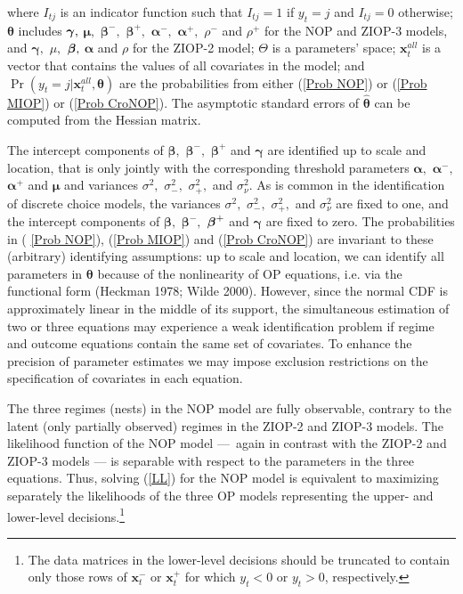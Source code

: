 \documentclass[letterpaper,fleqn,12pt]{article}
\begin{document}
\noindent where $I_{tj}$ is an indicator function such that $I_{tj}=1$ if $%
y_{t}=j$ and $I_{tj}=0$ otherwise; $\mathbf{\theta }$ includes $\mathbf{%
\gamma ,}$ $\mathbf{\mu ,}$ $\mathbf{\beta }^{-},$ $\mathbf{\beta }^{+},$ $%
\mathbf{\alpha }^{-},$ $\mathbf{\alpha }^{+},$ $\rho ^{-}$ and $\rho ^{+}$
for the NOP and ZIOP-3 models, and $\mathbf{\gamma },$ $\mu ,$ $\mathbf{%
\beta },$ $\mathbf{\alpha }$ and $\rho $ for the ZIOP-2 model; $\Theta $ is
a parameters' space; $\mathbf{x}_{t}^{all}$ is a vector that contains the
values of all covariates in the model; and $\Pr (y_{t}=j|\mathbf{x}%
_{t}^{all},\mathbf{\theta })$ are the probabilities from either (\ref{Prob
NOP}) or (\ref{Prob MIOP}) or (\ref{Prob CroNOP}). The asymptotic standard
errors of $\widehat{\mathbf{\theta }}$ can be computed from the Hessian
matrix.

The intercept components of $\mathbf{\beta ,}$ $\mathbf{\beta }^{-},$ $%
\mathbf{\beta }^{+}$ and $\mathbf{\gamma }$ are identified up to scale and
location, that is only jointly with the corresponding threshold parameters $%
\mathbf{\alpha ,}$ $\mathbf{\alpha }^{-}\mathbf{,}$ $\mathbf{\alpha }^{+}$
and $\mathbf{\mu }$ and variances $\sigma ^{2},$ $\sigma _{-}^{2},$ $\sigma
_{+}^{2},$ and $\sigma _{\nu }^{2}$. As is common in the identification of
discrete choice models, the variances $\sigma ^{2},$ $\sigma _{-}^{2},$ $%
\sigma _{+}^{2},$ and $\sigma _{\nu }^{2}$ are fixed to one, and the
intercept components of $\mathbf{\beta ,}$ $\mathbf{\beta }^{-},$ $\mathbf{%
\beta }^{+}$ and $\mathbf{\gamma }$ are fixed to zero. The probabilities in (%
\ref{Prob NOP}), (\ref{Prob MIOP}) and (\ref{Prob CroNOP}) are invariant to
these (arbitrary) identifying assumptions: up to scale and location, we can
identify all parameters in $\mathbf{\theta }$ because of the nonlinearity of
OP equations, i.e. via the functional form (Heckman 1978; Wilde 2000).
However, since the normal CDF is approximately linear in the middle of its
support, the simultaneous estimation of two or three equations may
experience a weak identification problem if regime and outcome equations
contain the same set of covariates. To enhance the precision of parameter
estimates we may impose exclusion restrictions on the specification of
covariates in each equation.

The three regimes (nests) in the NOP model are fully observable, contrary to
the latent (only partially observed) regimes in the ZIOP-2 and ZIOP-3
models. The likelihood function of the NOP model ---\ again in contrast with
the ZIOP-2 and ZIOP-3 models --- is separable with respect to the parameters
in the three equations. Thus, solving (\ref{LL}) for the NOP model is
equivalent to maximizing separately the likelihoods of the three OP models
representing the upper- and lower-level decisions.\footnote{%
The data matrices in the lower-level decisions should be truncated to
contain only those rows of $\mathbf{x}_{t}^{-}$ or $\mathbf{x}_{t}^{+}$ for
which $y_{t}<0$ or $y_{t}>0$, respectively.}
\end{document}
